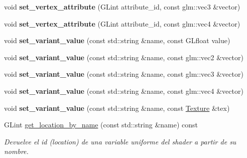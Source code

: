 \begin{DoxyCompactItemize}
\mbox{\label{classexample_1_1_shader___program_a5ee43d113b313bb6d79f5a2890799204}} 
void {\bfseries set\+\_\+vertex\+\_\+attribute} (G\+Lint attribute\+\_\+id, const glm\+::vec3 \&vector)
\item 
\mbox{\label{classexample_1_1_shader___program_a6bbe76513606a9a87cba7b4e3190ed03}} 
void {\bfseries set\+\_\+vertex\+\_\+attribute} (G\+Lint attribute\+\_\+id, const glm\+::vec4 \&vector)
\item 
\mbox{\label{classexample_1_1_shader___program_a18d971d346f8c48b9bf2206ec556f8c6}} 
void {\bfseries set\+\_\+variant\+\_\+value} (const std\+::string \&name, const G\+Lfloat value)
\item 
\mbox{\label{classexample_1_1_shader___program_a15b1ba1455bee9bff24a6d3ed8f29a92}} 
void {\bfseries set\+\_\+variant\+\_\+value} (const std\+::string \&name, const glm\+::vec2 \&vector)
\item 
\mbox{\label{classexample_1_1_shader___program_aa7a23bef3da0f252d7d84245e2182a89}} 
void {\bfseries set\+\_\+variant\+\_\+value} (const std\+::string \&name, const glm\+::vec3 \&vector)
\item 
\mbox{\label{classexample_1_1_shader___program_af90bb5f5221831ae859a1fc8bfb0b399}} 
void {\bfseries set\+\_\+variant\+\_\+value} (const std\+::string \&name, const glm\+::vec4 \&vector)
\item 
\mbox{\label{classexample_1_1_shader___program_a38459d84126c54662c658ccf386274c5}} 
void {\bfseries set\+\_\+variant\+\_\+value} (const std\+::string \&name, const \mbox{\hyperlink{classexample_1_1_texture}{Texture}} \&tex)
\item 
G\+Lint \mbox{\hyperlink{classexample_1_1_shader___program_a26373bbe694a2e5abec0815d0e489e40}{get\+\_\+location\+\_\+by\+\_\+name}} (const std\+::string \&name) const
\begin{DoxyCompactList}\small\item\em Devuelve el id (location) de una variable uniforme del shader a partir de su nombre. \end{DoxyCompactList}\end{DoxyCompactItemize}
